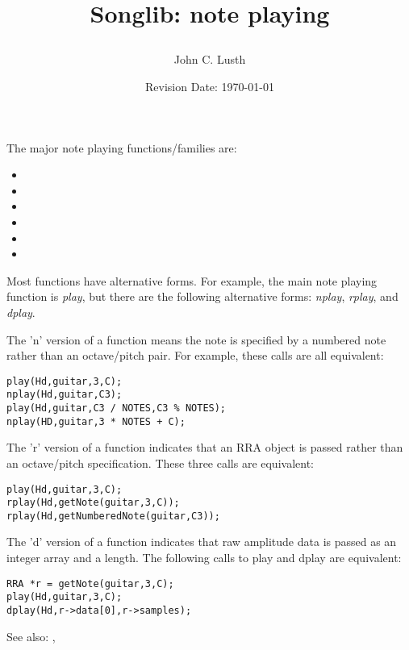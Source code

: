 \documentclass{article}
\title{Songlib: note playing\\
\date{Revision Date: \today}}
\author{John C. Lusth}
\begin{document}
\maketitle

\W\subsubsection*{}
\W\htmlrule

The major note playing functions/families are:

\begin{itemize}
\item
\item
\item
\item
\item
\item
\end{itemize}

Most functions have alternative forms. For example, the main note playing
function is {\it play}, but there are the following alternative forms:
{\it nplay}, {\it rplay}, and {\it dplay}.

The 'n' version of a function means the note is specified by a numbered
note rather than an octave/pitch pair. For example, these calls are
all equivalent:

\begin{verbatim}
play(Hd,guitar,3,C);
nplay(Hd,guitar,C3);
play(Hd,guitar,C3 / NOTES,C3 % NOTES);
nplay(HD,guitar,3 * NOTES + C);
\end{verbatim}

The 'r' version of a function indicates that an RRA object is passed
rather than an octave/pitch specification. These three calls are
equivalent:

\begin{verbatim}
play(Hd,guitar,3,C);
rplay(Hd,getNote(guitar,3,C));
rplay(Hd,getNumberedNote(guitar,C3));
\end{verbatim}

The 'd' version of a function indicates that raw amplitude data is passed
as an integer array and a length. The following calls to play and dplay
are equivalent:

\begin{verbatim}
RRA *r = getNote(guitar,3,C);
play(Hd,guitar,3,C);
dplay(Hd,r->data[0],r->samples);
\end{verbatim}

See also: \textcolor{red}{},\textcolor{red}{}
\end{document}
